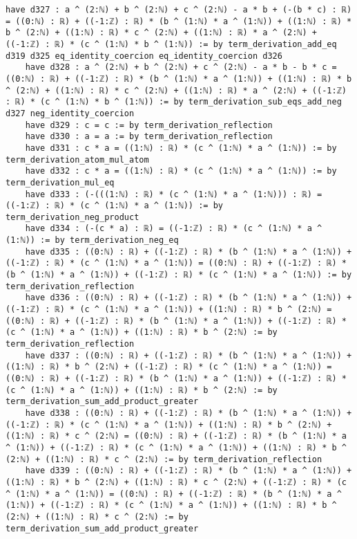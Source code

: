 \documentclass{article}
\begin{document}
\begin{tcolorbox}[colback=white!10, width=\linewidth]
\begin{lstlisting}[language=Lean4]
    have d327 : a ^ (2:ℕ) + b ^ (2:ℕ) + c ^ (2:ℕ) - a * b + (-(b * c) : ℝ) = ((0:ℕ) : ℝ) + ((-1:ℤ) : ℝ) * (b ^ (1:ℕ) * a ^ (1:ℕ)) + ((1:ℕ) : ℝ) * b ^ (2:ℕ) + ((1:ℕ) : ℝ) * c ^ (2:ℕ) + ((1:ℕ) : ℝ) * a ^ (2:ℕ) + ((-1:ℤ) : ℝ) * (c ^ (1:ℕ) * b ^ (1:ℕ)) := by term_derivation_add_eq d319 d325 eq_identity_coercion eq_identity_coercion d326
    have d328 : a ^ (2:ℕ) + b ^ (2:ℕ) + c ^ (2:ℕ) - a * b - b * c = ((0:ℕ) : ℝ) + ((-1:ℤ) : ℝ) * (b ^ (1:ℕ) * a ^ (1:ℕ)) + ((1:ℕ) : ℝ) * b ^ (2:ℕ) + ((1:ℕ) : ℝ) * c ^ (2:ℕ) + ((1:ℕ) : ℝ) * a ^ (2:ℕ) + ((-1:ℤ) : ℝ) * (c ^ (1:ℕ) * b ^ (1:ℕ)) := by term_derivation_sub_eqs_add_neg d327 neg_identity_coercion
    have d329 : c = c := by term_derivation_reflection
    have d330 : a = a := by term_derivation_reflection
    have d331 : c * a = ((1:ℕ) : ℝ) * (c ^ (1:ℕ) * a ^ (1:ℕ)) := by term_derivation_atom_mul_atom
    have d332 : c * a = ((1:ℕ) : ℝ) * (c ^ (1:ℕ) * a ^ (1:ℕ)) := by term_derivation_mul_eq
    have d333 : (-(((1:ℕ) : ℝ) * (c ^ (1:ℕ) * a ^ (1:ℕ))) : ℝ) = ((-1:ℤ) : ℝ) * (c ^ (1:ℕ) * a ^ (1:ℕ)) := by term_derivation_neg_product
    have d334 : (-(c * a) : ℝ) = ((-1:ℤ) : ℝ) * (c ^ (1:ℕ) * a ^ (1:ℕ)) := by term_derivation_neg_eq
    have d335 : ((0:ℕ) : ℝ) + ((-1:ℤ) : ℝ) * (b ^ (1:ℕ) * a ^ (1:ℕ)) + ((-1:ℤ) : ℝ) * (c ^ (1:ℕ) * a ^ (1:ℕ)) = ((0:ℕ) : ℝ) + ((-1:ℤ) : ℝ) * (b ^ (1:ℕ) * a ^ (1:ℕ)) + ((-1:ℤ) : ℝ) * (c ^ (1:ℕ) * a ^ (1:ℕ)) := by term_derivation_reflection
    have d336 : ((0:ℕ) : ℝ) + ((-1:ℤ) : ℝ) * (b ^ (1:ℕ) * a ^ (1:ℕ)) + ((-1:ℤ) : ℝ) * (c ^ (1:ℕ) * a ^ (1:ℕ)) + ((1:ℕ) : ℝ) * b ^ (2:ℕ) = ((0:ℕ) : ℝ) + ((-1:ℤ) : ℝ) * (b ^ (1:ℕ) * a ^ (1:ℕ)) + ((-1:ℤ) : ℝ) * (c ^ (1:ℕ) * a ^ (1:ℕ)) + ((1:ℕ) : ℝ) * b ^ (2:ℕ) := by term_derivation_reflection
    have d337 : ((0:ℕ) : ℝ) + ((-1:ℤ) : ℝ) * (b ^ (1:ℕ) * a ^ (1:ℕ)) + ((1:ℕ) : ℝ) * b ^ (2:ℕ) + ((-1:ℤ) : ℝ) * (c ^ (1:ℕ) * a ^ (1:ℕ)) = ((0:ℕ) : ℝ) + ((-1:ℤ) : ℝ) * (b ^ (1:ℕ) * a ^ (1:ℕ)) + ((-1:ℤ) : ℝ) * (c ^ (1:ℕ) * a ^ (1:ℕ)) + ((1:ℕ) : ℝ) * b ^ (2:ℕ) := by term_derivation_sum_add_product_greater
    have d338 : ((0:ℕ) : ℝ) + ((-1:ℤ) : ℝ) * (b ^ (1:ℕ) * a ^ (1:ℕ)) + ((-1:ℤ) : ℝ) * (c ^ (1:ℕ) * a ^ (1:ℕ)) + ((1:ℕ) : ℝ) * b ^ (2:ℕ) + ((1:ℕ) : ℝ) * c ^ (2:ℕ) = ((0:ℕ) : ℝ) + ((-1:ℤ) : ℝ) * (b ^ (1:ℕ) * a ^ (1:ℕ)) + ((-1:ℤ) : ℝ) * (c ^ (1:ℕ) * a ^ (1:ℕ)) + ((1:ℕ) : ℝ) * b ^ (2:ℕ) + ((1:ℕ) : ℝ) * c ^ (2:ℕ) := by term_derivation_reflection
    have d339 : ((0:ℕ) : ℝ) + ((-1:ℤ) : ℝ) * (b ^ (1:ℕ) * a ^ (1:ℕ)) + ((1:ℕ) : ℝ) * b ^ (2:ℕ) + ((1:ℕ) : ℝ) * c ^ (2:ℕ) + ((-1:ℤ) : ℝ) * (c ^ (1:ℕ) * a ^ (1:ℕ)) = ((0:ℕ) : ℝ) + ((-1:ℤ) : ℝ) * (b ^ (1:ℕ) * a ^ (1:ℕ)) + ((-1:ℤ) : ℝ) * (c ^ (1:ℕ) * a ^ (1:ℕ)) + ((1:ℕ) : ℝ) * b ^ (2:ℕ) + ((1:ℕ) : ℝ) * c ^ (2:ℕ) := by term_derivation_sum_add_product_greater

\end{lstlisting}
\end{tcolorbox}
\end{document}
